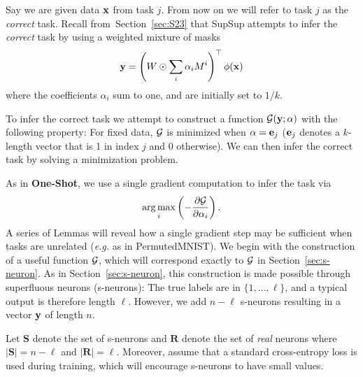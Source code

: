 \documentclass{article}
\DeclareMathOperator*{\argmax}{arg\,max}
\newcommand{\ac}{SupSup\xspace}
\newcommand{\secref}[1]{Section~\ref{sec:#1}}
\begin{document}
Say we are given data $\mathbf{x}$ from task $j$. From now on we will refer to task $j$ as the \textit{correct} task. Recall from~\secref{S23} that \ac attempts to infer the \textit{correct} task by using a weighted mixture of masks
\begin{align} \label{eq:susu-elm}
    \mathbf{y} = \left(  W \odot \sum_i \alpha_i M^i \right)^\top \phi(\mathbf{x})
\end{align}
where the coefficients $\alpha_i$ sum to one, and are initially set to $1/k$.

To infer the correct task we attempt to construct a function $\mathcal{G}(\mathbf{y}; \alpha)$ with the following property: For fixed data, $\mathcal{G}$ is minimized when $\alpha = \mathbf{e}_j$ ($\mathbf{e}_j$ denotes a $k$-length vector that is 1 in index $j$ and 0 otherwise). We can then infer the correct task by solving a minimization problem.

As in \textbf{One-Shot}, we use a single gradient computation to infer the task via
\begin{align}
\argmax_i  \round{ -\frac{\partial \Gcal}{\partial \alpha_i} }.
\end{align}
A series of Lemmas will reveal how a single gradient step may be sufficient when tasks are unrelated (\textit{e.g.} as in PermutedMNIST). We begin with the construction of a useful function $\mathcal{G}$, which will correspond exactly to $\mathcal{G}$ in Section~\ref{sec:s-neuron}. As in Section~\ref{sec:s-neuron}, this construction is made possible through superfluous neurons (s-neurons): The true labels are in $\{1,...,\ell \}$, and a typical output is therefore length $\ell$. However, we add $n-\ell$ s-neurons resulting in a vector $\mathbf{y}$ of length $n$. 

Let $\mathbf{S}$ denote the set of s-neurons and $\mathbf{R}$ denote the set of \emph{real} neurons where $|\mathbf{S}| = n-\ell$ and $|\mathbf{R}| = \ell$. Moreover, assume that a standard cross-entropy loss is used during training, which will encourage s-neurons to have small values. 
\end{document}
